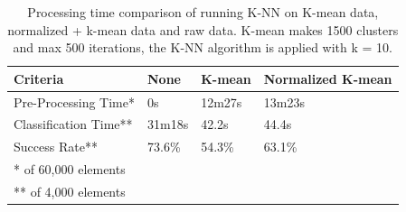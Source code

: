 \begin{table}[H]
\centering
\begin{tabular}{|l|p{2cm}|p{2cm}|p{2cm}|}\hline
Criteria              & None   & K-mean & Normalized K-mean \\ \hline
Pre-Processing Time*  & 0s     & 12m27s & 13m23s            \\ \hline
Classification Time** & 31m18s & 42.2s  & 44.4s             \\ \hline
Success Rate**        & 73.6\% & 54.3\% & 63.1\%            \\ \hline
\multicolumn{4}{|l|}{* of 60,000 elements} \\ 
\multicolumn{4}{|l|}{** of 4,000 elements} \\ \hline
\end{tabular}
\caption{Processing time comparison of running K-NN on K-mean data, normalized + k-mean data and raw data. K-mean makes 1500 clusters and max 500 iterations, the K-NN algorithm is applied with k = 10.}
\label{tab:processingtime_kmean_vs_raw_knn}
\end{table}